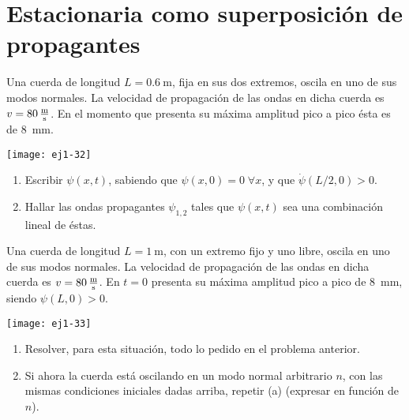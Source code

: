 \section*{Estacionaria como superposición de propagantes}

\item 
\begin{minipage}[t][2cm]{0.6\textwidth}
Una cuerda de longitud $L = \SI{0.6}{\metre}$, fija en sus dos extremos, oscila en uno de sus modos normales.
La velocidad de propagación de las ondas en dicha cuerda es \(v = \SI{80}{\metre\over\second}\).
En el momento que presenta su máxima amplitud pico a pico ésta es de \SI{8}{\milli\metre}.
\end{minipage}
\begin{minipage}[c][1.5cm][t]{0.34\textwidth}
	\texttt{[image: ej1-32]}
\end{minipage}
\begin{enumerate}
	\item Escribir $\psi(x,t)$, sabiendo que $\psi(x,0) = 0\;\forall x$, y que $\dot{\psi}(L/2,0) > 0$.
	\item Hallar las ondas propagantes $\psi_{1,2}$ tales que $\psi(x,t)$ sea una combinación lineal de éstas.
\end{enumerate}


\item 
\begin{minipage}[t][2.6cm]{0.6\textwidth}
Una cuerda de longitud $L = \SI{1}{\metre}$, con un extremo fijo y uno libre, oscila en uno de sus modos normales.
La velocidad de propagación de las ondas en dicha cuerda es \(v= \SI{80}{\metre\over\second}\).
En \(t = 0\) presenta su máxima amplitud pico a pico de \SI{8}{\milli\metre}, siendo $\psi(L,0) > 0$.
\end{minipage}
\begin{minipage}[c][0.4cm][t]{0.34\textwidth}
	\texttt{[image: ej1-33]}
\end{minipage}
\begin{enumerate}
	\item Resolver, para esta situación, todo lo pedido en el problema anterior. 
	\item Si ahora la cuerda está oscilando en un modo normal arbitrario $n$, con las mismas condiciones iniciales dadas arriba, repetir (a) (expresar en función de $n$).
\end{enumerate}
